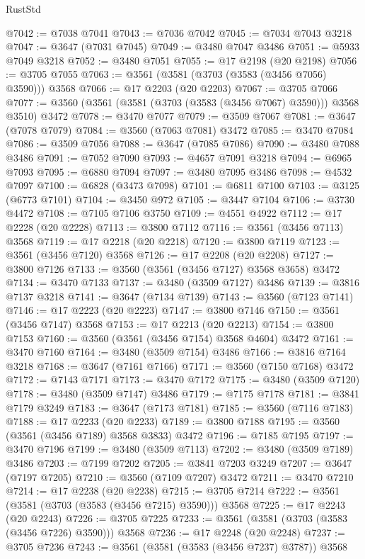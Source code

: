 \begin{lexlean}{RustStd}
\begin{coremodule}
@7042 := @7038 @7041
@7043 := @7036 @7042
@7045 := @7034 @7043 @3218
@7047 := @3647 (@7031 @7045)
@7049 := @3480 @7047 @3486
@7051 := @5933 @7049 @3218
@7052 := @3480 @7051
@7055 := @17 @2198 (@20 @2198)
@7056 := @3705 @7055
@7063 := @3561 (@3581 (@3703 (@3583 (@3456 @7056) @3590))) @3568
@7066 := @17 @2203 (@20 @2203)
@7067 := @3705 @7066
@7077 := @3560 (@3561 (@3581 (@3703 (@3583 (@3456 @7067) @3590))) @3568 @3510) @3472
@7078 := @3470 @7077
@7079 := @3509 @7067
@7081 := @3647 (@7078 @7079)
@7084 := @3560 (@7063 @7081) @3472
@7085 := @3470 @7084
@7086 := @3509 @7056
@7088 := @3647 (@7085 @7086)
@7090 := @3480 @7088 @3486
@7091 := @7052 @7090
@7093 := @4657 @7091 @3218
@7094 := @6965 @7093
@7095 := @6880 @7094
@7097 := @3480 @7095 @3486
@7098 := @4532 @7097
@7100 := @6828 (@3473 @7098)
@7101 := @6811 @7100
@7103 := @3125 (@6773 @7101)
@7104 := @3450 @972
@7105 := @3447 @7104
@7106 := @3730 @4472
@7108 := @7105 @7106 @3750
@7109 := @4551 @4922
@7112 := @17 @2228 (@20 @2228)
@7113 := @3800 @7112
@7116 := @3561 (@3456 @7113) @3568
@7119 := @17 @2218 (@20 @2218)
@7120 := @3800 @7119
@7123 := @3561 (@3456 @7120) @3568
@7126 := @17 @2208 (@20 @2208)
@7127 := @3800 @7126
@7133 := @3560 (@3561 (@3456 @7127) @3568 @3658) @3472
@7134 := @3470 @7133
@7137 := @3480 (@3509 @7127) @3486
@7139 := @3816 @7137 @3218
@7141 := @3647 (@7134 @7139)
@7143 := @3560 (@7123 @7141)
@7146 := @17 @2223 (@20 @2223)
@7147 := @3800 @7146
@7150 := @3561 (@3456 @7147) @3568
@7153 := @17 @2213 (@20 @2213)
@7154 := @3800 @7153
@7160 := @3560 (@3561 (@3456 @7154) @3568 @4604) @3472
@7161 := @3470 @7160
@7164 := @3480 (@3509 @7154) @3486
@7166 := @3816 @7164 @3218
@7168 := @3647 (@7161 @7166)
@7171 := @3560 (@7150 @7168) @3472
@7172 := @7143 @7171
@7173 := @3470 @7172
@7175 := @3480 (@3509 @7120)
@7178 := @3480 (@3509 @7147) @3486
@7179 := @7175 @7178
@7181 := @3841 @7179 @3249
@7183 := @3647 (@7173 @7181)
@7185 := @3560 (@7116 @7183)
@7188 := @17 @2233 (@20 @2233)
@7189 := @3800 @7188
@7195 := @3560 (@3561 (@3456 @7189) @3568 @3833) @3472
@7196 := @7185 @7195
@7197 := @3470 @7196
@7199 := @3480 (@3509 @7113)
@7202 := @3480 (@3509 @7189) @3486
@7203 := @7199 @7202
@7205 := @3841 @7203 @3249
@7207 := @3647 (@7197 @7205)
@7210 := @3560 (@7109 @7207) @3472
@7211 := @3470 @7210
@7214 := @17 @2238 (@20 @2238)
@7215 := @3705 @7214
@7222 := @3561 (@3581 (@3703 (@3583 (@3456 @7215) @3590))) @3568
@7225 := @17 @2243 (@20 @2243)
@7226 := @3705 @7225
@7233 := @3561 (@3581 (@3703 (@3583 (@3456 @7226) @3590))) @3568
@7236 := @17 @2248 (@20 @2248)
@7237 := @3705 @7236
@7243 := @3561 (@3581 (@3583 (@3456 @7237) @3787)) @3568

\end{coremodule}
\end{lexlean}
